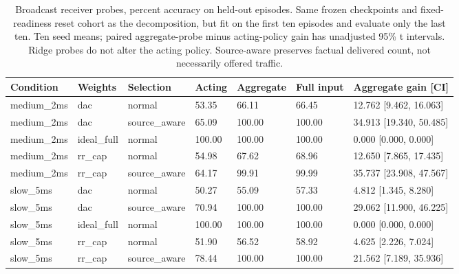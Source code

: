 \begin{table}[!htbp]\centering\scriptsize
\caption{Broadcast receiver probes, percent accuracy on held-out episodes. Same frozen checkpoints and fixed-readiness reset cohort as the decomposition, but fit on the first ten episodes and evaluate only the last ten. Ten seed means; paired aggregate-probe minus acting-policy gain has unadjusted 95\% t intervals. Ridge probes do not alter the acting policy. Source-aware preserves factual delivered count, not necessarily offered traffic.}\label{tab:receiver_probe}
\begin{tabular}{lllllll}\toprule
Condition & Weights & Selection & Acting & Aggregate & Full input & Aggregate gain [CI]\\\midrule
medium\_2ms & dac & normal & 53.35 & 66.11 & 66.45 & 12.762 [9.462, 16.063]\\
medium\_2ms & dac & source\_aware & 65.09 & 100.00 & 100.00 & 34.913 [19.340, 50.485]\\
medium\_2ms & ideal\_full & normal & 100.00 & 100.00 & 100.00 & 0.000 [0.000, 0.000]\\
medium\_2ms & rr\_cap & normal & 54.98 & 67.62 & 68.96 & 12.650 [7.865, 17.435]\\
medium\_2ms & rr\_cap & source\_aware & 64.17 & 99.91 & 99.99 & 35.737 [23.908, 47.567]\\
slow\_5ms & dac & normal & 50.27 & 55.09 & 57.33 & 4.812 [1.345, 8.280]\\
slow\_5ms & dac & source\_aware & 70.94 & 100.00 & 100.00 & 29.062 [11.900, 46.225]\\
slow\_5ms & ideal\_full & normal & 100.00 & 100.00 & 100.00 & 0.000 [0.000, 0.000]\\
slow\_5ms & rr\_cap & normal & 51.90 & 56.52 & 58.92 & 4.625 [2.226, 7.024]\\
slow\_5ms & rr\_cap & source\_aware & 78.44 & 100.00 & 100.00 & 21.562 [7.189, 35.936]\\
\bottomrule\end{tabular}\end{table}